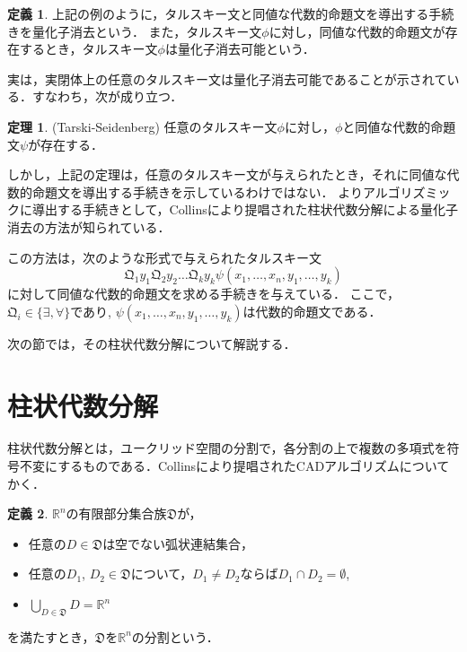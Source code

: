 \documentclass[uplatex, dvipdfmx]{jsarticle}
\newcommand{\R}{\mathbb{R}}
\newcommand{\Qua}{\mathfrak{Q}}
\theoremstyle{definition}
\newtheorem{definition}{定義}[section]
\newtheorem{theorem}{定理}[section]
\begin{document}
\begin{definition}
上記の例のように，タルスキー文と同値な代数的命題文を導出する手続きを量化子消去という．
また，タルスキー文$\phi$に対し，同値な代数的命題文が存在するとき，タルスキー文$\phi$は量化子消去可能という．
\end{definition}

実は，実閉体上の任意のタルスキー文は量化子消去可能であることが示されている．すなわち，次が成り立つ．

\begin{theorem}(Tarski-Seidenberg)
     任意のタルスキー文$\phi$に対し，$\phi$と同値な代数的命題文$\psi$が存在する．
\end{theorem}

しかし，上記の定理は，任意のタルスキー文が与えられたとき，それに同値な代数的命題文を導出する手続きを示しているわけではない．
よりアルゴリズミックに導出する手続きとして，Collinsにより提唱された柱状代数分解による量化子消去の方法が知られている．

この方法は，次のような形式で与えられたタルスキー文
\begin{equation*}
     \Qua_1 y_1 \Qua_2 y_2 \dots \Qua_k y_k \psi(x_1, \dots, x_n, y_1, \dots, y_k)
\end{equation*}
に対して同値な代数的命題文を求める手続きを与えている．
ここで，$\Qua_i \in \{\exists, \forall\}$であり, $\psi(x_1, \dots, x_n, y_1, \dots, y_k)$は代数的命題文である． 

次の節では，その柱状代数分解について解説する．


\section{柱状代数分解}
柱状代数分解とは，ユークリッド空間の分割で，各分割の上で複数の多項式を符号不変にするものである．Collinsにより提唱されたCADアルゴリズムについてかく．
\begin{definition}
$\R^n$の有限部分集合族$\mathfrak{D}$が，

\begin{itemize}
	\item 任意の$D \in \mathfrak{D}$は空でない弧状連結集合，
	\item 任意の$D_1$, $D_2 \in \mathfrak{D}$について，$D_1 \neq D_2$ならば$D_1 \cap D_2 = \emptyset$,
	\item $\bigcup_{D \in \mathfrak{D}}D = \R^n$
\end{itemize}

を満たすとき，$\mathfrak{D}$を$\R^n$の分割という．
\end{definition}
\end{document}
